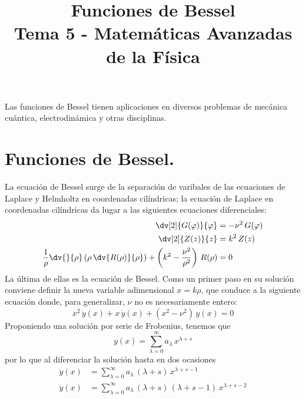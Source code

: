
\title{Funciones de Bessel \\ {\large Tema 5 - Matemáticas Avanzadas de la Física}\vspace{-1.5\baselineskip}}
\date{ }

\maketitle
\fontsize{14}{14}\selectfont
Las funciones de Bessel tienen aplicaciones en diversos problemas de mecánica cuántica, electrodinámica y otras disciplinas.
\section{Funciones de Bessel.}
La ecuación de Bessel surge de la separación de varibales de las ecuaciones de Laplace y Helmholtz en coordenadas cilíndricas; la ecuación de Laplace en coordenadas cilíndricas da lugar a las siguientes ecuaciones diferenciales:
\begin{align}
\begin{aligned}
\dv[2]{G(\varphi)}{\varphi} &= - \nu^{2} \, G(\varphi) \\
\dv[2]{Z(z)}{z} &= k^{2} \, Z(z) \\
\dfrac{1}{\rho} \dv{}{\rho} \left( \rho \, \dv{R(\rho)}{\rho} \right) + \left( k^{2} - \dfrac{\nu^{2}}{\rho^{2}} \right) \, R(\rho) &= 0
\end{aligned}
\label{eq:ecuacion_08_02} 
\end{align}
La última de ellas es la ecuación de Bessel. Como un primer paso en su solución conviene definir la nueva variable adimensional $ x = k \rho$, que conduce a la siguiente ecuación donde, para generalizar, $\nu$ no es necesariamente entero:
\begin{equation}
x^{2} \, \ddot{y} (x) +  x \, \dot{y} (x) +  (x^{2} - \nu^{2}) \, y(x) = 0
\label{eq:ecuacion_08_03}
\end{equation}
Proponiendo una solución por serie de Frobenius, tenemos que
\[ y(x) = \sum_{\lambda=0}^{\infty} a_{\lambda} \, x^{\lambda + s} \]
por lo que al diferenciar la solución hasta en dos ocasiones
\begin{align*}
\dot{y}(x) &= \sum_{\lambda=0}^{\infty} a_{\lambda} \, (\lambda + s) \, x^{\lambda + s - 1} \\
\ddot{y}(x) &= \sum_{\lambda=0}^{\infty} a_{\lambda} \, (\lambda + s) \, (\lambda + s - 1) \, x^{\lambda + s - 2}
\end{align*}
